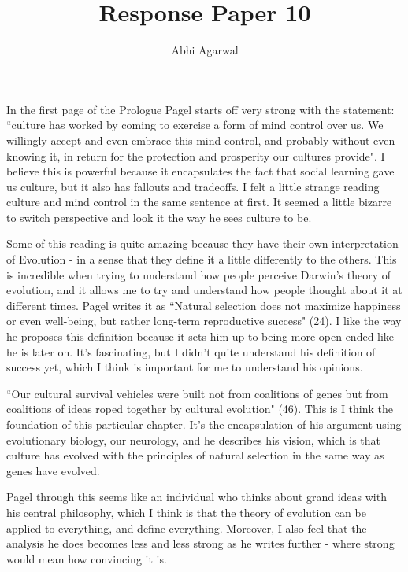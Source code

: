 \documentclass[11pt, oneside]{article}
\title{Response Paper 10}
\author{Abhi Agarwal}
\date{}
\begin{document}
\maketitle

\par In the first page of the Prologue Pagel starts off very strong with the statement: ``culture has worked by coming to exercise a form of mind control over us. We willingly accept and even embrace this mind control, and probably without even knowing it, in return for the protection and prosperity our cultures provide". I believe this is powerful because it encapsulates the fact that social learning gave us culture, but it also has fallouts and tradeoffs. I felt a little strange reading culture and mind control in the same sentence at first. It seemed a little bizarre to switch perspective and look it the way he sees culture to be. 

\par Some of this reading is quite amazing because they have their own interpretation of Evolution - in a sense that they define it a little differently to the others. This is incredible when trying to understand how people perceive Darwin's theory of evolution, and it allows me to try and understand how people thought about it at different times. Pagel writes it as ``Natural selection does not maximize happiness or even well-being, but rather long-term reproductive success" (24). I like the way he proposes this definition because it sets him up to being more open ended like he is later on. It's fascinating, but I didn't quite understand his definition of success yet, which I think is important for me to understand his opinions. 

\par ``Our cultural survival vehicles were built not from coalitions of genes but from coalitions of ideas roped together by cultural evolution" (46). This is I think the foundation of this particular chapter. It's the encapsulation of his argument using evolutionary biology, our neurology, and he describes his vision, which is that culture has evolved with the principles of natural selection in the same way as genes have evolved. 

\par Pagel through this seems like an individual who thinks about grand ideas with his central philosophy, which I think is that the theory of evolution can be applied to everything, and define everything. Moreover, I also feel that the analysis he does becomes less and less strong as he writes further - where strong would mean how convincing it is. 
\end{document}
